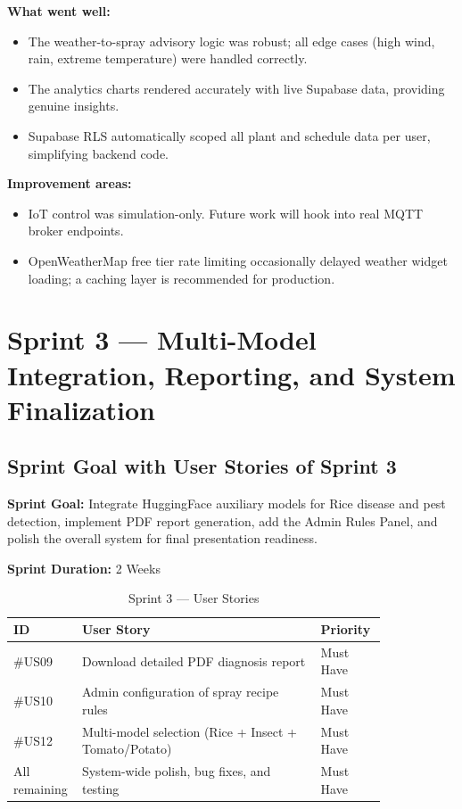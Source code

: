 \documentclass[12pt,a4paper]{report}
\begin{document}
\textbf{What went well:}
\begin{itemize}
  \item The weather-to-spray advisory logic was robust; all edge cases (high wind, rain, extreme temperature) were handled correctly.
  \item The analytics charts rendered accurately with live Supabase data, providing genuine insights.
  \item Supabase RLS automatically scoped all plant and schedule data per user, simplifying backend code.
\end{itemize}

\textbf{Improvement areas:}
\begin{itemize}
  \item IoT control was simulation-only. Future work will hook into real MQTT broker endpoints.
  \item OpenWeatherMap free tier rate limiting occasionally delayed weather widget loading; a caching layer is recommended for production.
\end{itemize}

\newpage

\section{Sprint 3 --- Multi-Model Integration, Reporting, and System Finalization}

\subsection{Sprint Goal with User Stories of Sprint 3}
\textbf{Sprint Goal:} Integrate HuggingFace auxiliary models for Rice disease and pest detection, implement PDF report generation, add the Admin Rules Panel, and polish the overall system for final presentation readiness.

\textbf{Sprint Duration:} 2 Weeks

\begin{table}[H]
\centering
\caption{Sprint 3 — User Stories}
\begin{tabular}{p{0.08\linewidth} p{0.60\linewidth} p{0.15\linewidth}}
\toprule
\textbf{ID} & \textbf{User Story} & \textbf{Priority} \\
\midrule
\#US09 & Download detailed PDF diagnosis report & Must Have \\
\#US10 & Admin configuration of spray recipe rules & Must Have \\
\#US12 & Multi-model selection (Rice + Insect + Tomato/Potato) & Must Have \\
All remaining & System-wide polish, bug fixes, and testing & Must Have \\
\bottomrule
\end{tabular}
\end{table}
\end{document}
